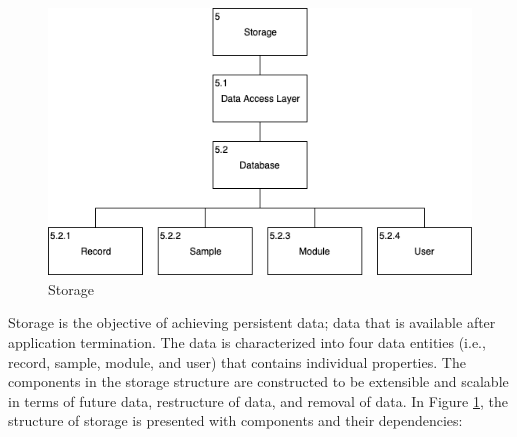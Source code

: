 \begin{figure}
    \centering
    \includegraphics[scale=0.6]{images/Storage.png}
    \caption{Storage}
    \label{fig:hta_storage}
\end{figure}

Storage is the objective of achieving persistent data; data that is available after application termination. The data is characterized into four data entities (i.e., record, sample, module, and user) that contains individual properties.  The components in the storage structure are constructed to be extensible and scalable in terms of future data, restructure of data, and removal of data.  In Figure \ref{fig:hta_storage}, the structure of storage is presented with components and their dependencies: 

